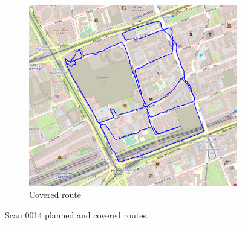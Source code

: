 \documentclass[a4paper,12pt]{book}
\begin{document}
\begin{enumerate}
\begin{figure}[H]
		\begin{subfigure}{.90\textwidth}
			\centering
			\includegraphics[width=1\linewidth]{route_c14}
			\caption{Covered route}
			\label{fig:b14}
		\end{subfigure}
		\caption{Scan 0014 planned and covered routes.}
		\label{fig:fig14}
	\end{figure} 
	\pagebreak
	

\end{enumerate}
\end{document}
